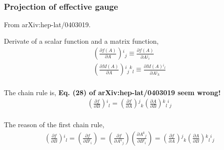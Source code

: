 \subsubsection{\label{sec:projection_of_effective_gauge_new}Projection of effective gauge}

\begin{tcolorbox}

From arXiv:hep-lat/0403019.

Derivate of a scalar function and a matrix function,    
\begin{equation}
\begin{split}
&\left(\frac{\partial f (A)}{\partial A} \right){}^i{}_j \equiv \frac{\partial f (A)}{\partial A {}^j{}_i} \\
&\left(\frac{\partial M (A)}{\partial A} \right){}^i{}_j{}^k{}_l \equiv \frac{\partial M (A) {}^i{}_l}{\partial A {}^j{}_k} \\
\end{split}
\end{equation}

The chain rule is, \textbf{Eq. (28) of arXiv:hep-lat/0403019 seem wrong!}
\begin{equation}
\begin{split}
&\left(\frac{\partial f }{\partial B} \right){}^i{}_l =  \left(\frac{\partial f }{\partial A} \right){}^j{}_k \left(\frac{\partial A}{\partial B} \right){}^k{}_l{}^i{}_j\\
\end{split}
\end{equation}

The reason of the first chain rule,
\begin{equation}
\begin{split}
&\left(\frac{\partial f }{\partial B} \right){}^i{}_l = \left(\frac{\partial f }{\partial B{}^l{}_i} \right)= \left(\frac{\partial f }{\partial A{}^k{}_j} \right)\left(\frac{\partial A{}^k{}_j }{\partial B{}^l{}_i} \right)=\left(\frac{\partial f }{\partial A} \right){}^j{}_k \left(\frac{\partial A}{\partial B} \right){}^k{}_l{}^i{}_j\\
\end{split}
\end{equation}


\end{tcolorbox}

